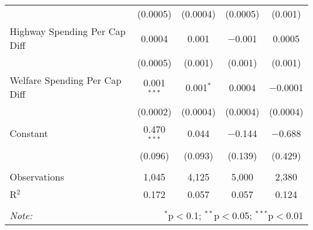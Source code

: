 \begin{table}[!htbp]
\begin{tabular}{@{\extracolsep{5pt}}lcccc}
  & (0.0005) & (0.0004) & (0.0005) & (0.001) \\ 
  Highway Spending Per Cap Diff & 0.0004 & 0.001 & $-$0.001 & 0.0005 \\ 
  & (0.0005) & (0.001) & (0.001) & (0.001) \\ 
  Welfare Spending Per Cap Diff & 0.001$^{***}$ & 0.001$^{*}$ & 0.0004 & $-$0.0001 \\ 
  & (0.0002) & (0.0004) & (0.0004) & (0.0004) \\ 
  Constant & 0.470$^{***}$ & 0.044 & $-$0.144 & $-$0.688 \\ 
  & (0.096) & (0.093) & (0.139) & (0.429) \\ 
 \hline \\[-1.8ex] 
Observations & 1,045 & 4,125 & 5,000 & 2,380 \\ 
R$^{2}$ & 0.172 & 0.057 & 0.057 & 0.124 \\ 
\hline 
\hline \\[-1.8ex] 
\textit{Note:}  & \multicolumn{4}{r}{$^{*}$p$<$0.1; $^{**}$p$<$0.05; $^{***}$p$<$0.01} \\ 
\end{tabular} 
\end{table} 
